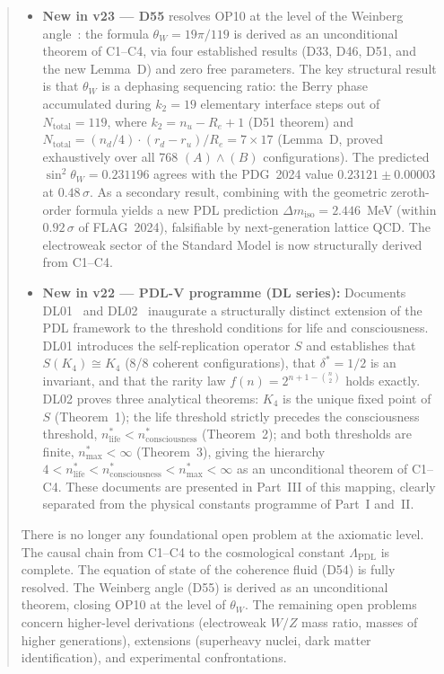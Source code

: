 \documentclass[11pt,a4paper]{article}
\theoremstyle{plain}
\theoremstyle{definition}
\theoremstyle{remark}
\begin{document}
\begin{abstract}
\begin{itemize}
\item \textbf{New in v23 --- D55} resolves OP10 at the level of the Weinberg angle~\cite{D55}: the formula $\theta_W = 19\pi/119$ is derived as an unconditional theorem of C1--C4, via four established results (D33, D46, D51, and the new Lemma~D) and zero free parameters. The key structural result is that $\theta_W$ is a dephasing sequencing ratio: the Berry phase accumulated during $k_2 = 19$ elementary interface steps out of $N_{\mathrm{total}} = 119$, where $k_2 = n_u - R_e + 1$ (D51 theorem) and $N_{\mathrm{total}} = (n_d/4)\cdot(r_d-r_u)/R_e = 7\times 17$ (Lemma~D, proved exhaustively over all 768 $(A)\wedge(B)$ configurations). The predicted $\sin^2\theta_W = 0.231196$ agrees with the PDG~2024 value $0.23121\pm0.00003$ at $0.48\,\sigma$. As a secondary result, combining with the geometric zeroth-order formula yields a new PDL prediction $\Delta m_{\mathrm{iso}} = 2.446$~MeV (within $0.92\,\sigma$ of FLAG~2024), falsifiable by next-generation lattice QCD. The electroweak sector of the Standard Model is now structurally derived from C1--C4.
\item \textbf{New in v22 --- PDL-V programme (DL series):} Documents DL01~\cite{DL01} and DL02~\cite{DL02} inaugurate a structurally distinct extension of the PDL framework to the threshold conditions for life and consciousness. DL01 introduces the self-replication operator $S$ and establishes that $S(K_4) \cong K_4$ (8/8 coherent configurations), that $\delta^* = 1/2$ is an invariant, and that the rarity law $f(n) = 2^{n+1-\binom{n}{2}}$ holds exactly. DL02 proves three analytical theorems: $K_4$ is the unique fixed point of $S$ (Theorem~1); the life threshold strictly precedes the consciousness threshold, $n^*_{\mathrm{life}} < n^*_{\mathrm{consciousness}}$ (Theorem~2); and both thresholds are finite, $n^*_{\mathrm{max}} < \infty$ (Theorem~3), giving the hierarchy $4 < n^*_{\mathrm{life}} < n^*_{\mathrm{consciousness}} < n^*_{\mathrm{max}} < \infty$ as an unconditional theorem of C1--C4. These documents are presented in Part~III of this mapping, clearly separated from the physical constants programme of Part~I and~II.
\end{itemize}
There is no longer any foundational open problem at the axiomatic level. The causal chain from C1--C4 to the cosmological constant $\Lambda_{\mathrm{PDL}}$ is complete. The equation of state of the coherence fluid (D54) is fully resolved. The Weinberg angle (D55) is derived as an unconditional theorem, closing OP10 at the level of $\theta_W$. The remaining open problems concern higher-level derivations (electroweak $W/Z$ mass ratio, masses of higher generations), extensions (superheavy nuclei, dark matter identification), and experimental confrontations.
\end{abstract}
\end{document}
